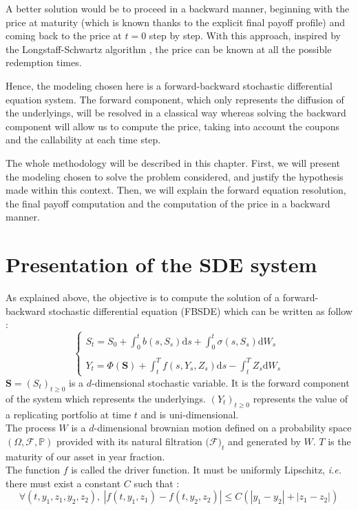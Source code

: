 \documentclass[a4paper,11pt,english]{book}
\begin{document}
A better solution would be to proceed in a backward manner, beginning with the price at maturity (which is known thanks to the explicit final payoff profile) and coming back to the price at $t=0$ step by step. With this approach, inspired by the Longstaff-Schwartz algorithm \cite{schwartz2001valuing}, the price can be known at all the possible redemption times.

Hence, the modeling chosen here is a forward-backward stochastic differential equation system. The forward component, which only represents the diffusion of the underlyings, will be resolved in a classical way whereas solving the backward component will allow us to compute the price, taking into account the coupons and the callability at each time step.

The whole methodology will be described in this chapter. First, we will present the modeling chosen to solve the problem considered, and justify the hypothesis made within this context. Then, we will explain the forward equation resolution, the final payoff computation and the computation of the price in a backward manner.


\section{Presentation of the SDE system}
\label{sec:SDE-presentation}
As explained above, the objective is to compute the solution of  a forward-backward stochastic differential equation (FBSDE) which can be written as follow :
$$\begin{cases}
S_{t} = S_{0}+\int_{0}^{t}b(s,S_{s})\text{d}s +\int_{0}^{t} \sigma(s,S_{s})\text{d}W_{s}\\
 \\
Y_{t} = \Phi(\textbf{S}) + \int_{t}^{T}f(s,Y_{s},Z_{s})\text{d}s -\int_{t}^{T}Z_{s}\text{d}W_{s}
\end{cases}$$
$\textbf{S}=(S_{t})_{t\geq0}$ is a $d$-dimensional stochastic variable. It is the forward component of the system which represents the underlyings. $(Y_{t})_{t\geq0}$ represents the value of a replicating portfolio at time $t$ and is uni-dimensional.\\
The process $W$ is a $d$-dimensional brownian motion defined on a probability space $(\Omega,\mathcal{F},\mathbb{P})$ provided with its natural filtration $(\mathcal{F)}_{t}$ and generated by $W$. 
$T$ is the maturity of our asset in year fraction.\\

The function $f$ is called the driver function. It must be uniformly Lipschitz, \textit{i.e.} there must exist a constant $C$ such that :
$$\forall (t, y_{1},z_{1}, y_{2},z_{2}),~ |f(t,y_{1},z_{1})-f(t,y_{2},z_{2})|\leq C(|y_{1}-y_{2}|+|z_{1}-z_{2}|)$$
\end{document}
